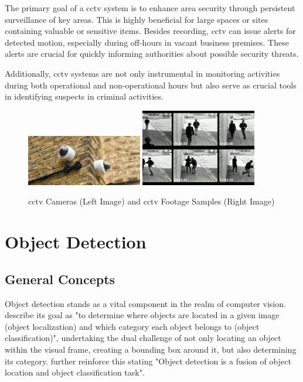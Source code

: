 The primary goal of a \ac{cctv} system is to enhance area security through persistent surveillance of key areas. This is highly beneficial for large spaces or sites containing valuable or sensitive items. Besides recording, \ac{cctv} can issue alerts for detected motion, especially during off-hours in vacant business premises. These alerts are crucial for quickly informing authorities about possible security threats.

Additionally, \ac{cctv} systems are not only instrumental in monitoring activities during both operational and non-operational hours but also serve as crucial tools in identifying suspects in criminal activities.

\begin{figure}[h]
    \centering
    \includegraphics[width=0.45\textwidth]{figs/cctv.jpg}
    \hfill
    \includegraphics[width=0.45\textwidth]{figs/cctv-footage.png}
    \caption{\ac{cctv} Cameras (Left Image) and \ac{cctv} Footage Samples (Right Image)}
    \label{fig:cctv-and-footage}
\end{figure}


\section{Object Detection}
\subsection{General Concepts}
Object detection stands as a vital component in the realm of computer vision. \citet{rfc2} describe its goal as "to determine where objects are located in a given image (object localization) and which category each object belongs to (object classification)", undertaking the dual challenge of not only locating an object within the visual frame, creating a bounding box around it, but also determining its category. \citet{rfc9} further reinforce this stating "Object detection is a fusion of object location and object classification task".

